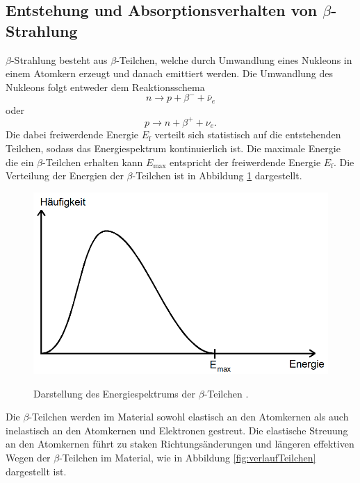 \subsection{\texorpdfstring{Entstehung und Absorptionsverhalten von $\beta$-Strahlung}{}}
$\beta$-Strahlung besteht aus $\beta$-Teilchen, welche durch Umwandlung eines Nukleons in einem Atomkern erzeugt und danach emittiert werden.
Die Umwandlung des Nukleons folgt entweder dem Reaktionsschema
\begin{equation}
 n \to p + \beta^- +\overline{\nu}_e
\end{equation}
oder 
\begin{equation}
p \to n + \beta^+ +\nu_e\text{.}
\end{equation}
Die dabei freiwerdende Energie $E_\text{f}$ verteilt sich statistisch auf die entstehenden Teilchen, sodass das Energiespektrum kontinuierlich ist. Die maximale Energie die ein $\beta$-Teilchen erhalten kann $E_\text{max}$ entspricht der freiwerdende Energie $E_\text{f}$. Die Verteilung der Energien der $\beta$-Teilchen ist in Abbildung \ref{fig:eSpektrum} dargestellt.
\begin{figure}
	\centering
	\caption{Darstellung des Energiespektrums der $\beta$-Teilchen \cite{V704}.}
	\includegraphics[width=\linewidth-170pt,height=\textheight-170pt,keepaspectratio]{content/images/emissionEnergie.png}
	\label{fig:eSpektrum}
\end{figure}
Die $\beta$-Teilchen werden im Material sowohl elastisch an den Atomkernen als auch inelastisch an den Atomkernen und Elektronen gestreut.
Die elastische Streuung an den Atomkernen führt zu staken Richtungsänderungen und längeren effektiven Wegen der $\beta$-Teilchen im Material, wie in Abbildung \ref{fig:verlaufTeilchen} dargestellt ist.
